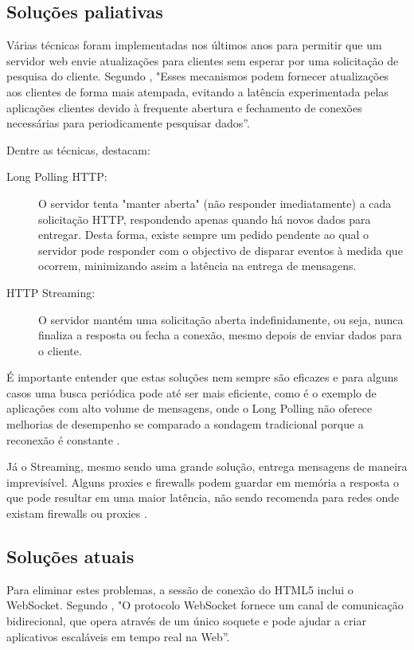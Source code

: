 \subsection{Soluções paliativas}

Várias técnicas foram implementadas nos últimos anos para permitir que um servidor web envie atualizações para clientes sem esperar por uma solicitação de pesquisa do cliente. Segundo \citet[p.~3]{Loreto2011}, "Esses mecanismos podem fornecer atualizações aos clientes de forma mais atempada, evitando a latência experimentada pelas aplicações clientes devido à frequente abertura e fechamento de conexões necessárias para periodicamente pesquisar dados”.

Dentre as técnicas, \citet{Loreto2011} destacam:
\begin{description}
	\item[Long Polling HTTP:] O servidor tenta "manter aberta" (não responder imediatamente) a cada solicitação HTTP, respondendo apenas quando há novos dados para entregar. Desta forma, existe sempre um pedido pendente ao qual o servidor pode responder com o objectivo de disparar eventos à medida que ocorrem, minimizando assim a latência na entrega de mensagens.

	\item[HTTP Streaming:] O servidor mantém uma solicitação aberta indefinidamente, ou seja, nunca finaliza a resposta ou fecha a conexão, mesmo depois de enviar dados para o cliente.
\end{description}

É importante entender que estas soluções nem sempre são eficazes e para alguns casos uma busca periódica pode até ser mais eficiente, como é o exemplo de aplicações com alto volume de mensagens, onde o Long Polling não oferece melhorias de desempenho se comparado a sondagem tradicional porque a reconexão é constante \citep{Wang2013}.

Já o Streaming, mesmo sendo uma grande solução, entrega mensagens de maneira imprevisível. Alguns proxies e firewalls podem guardar em memória a resposta o que pode resultar em uma maior latência, não sendo recomenda para redes onde existam firewalls ou proxies \citep[p.~6]{Wang2013}.

\subsection{Soluções atuais}

Para eliminar estes problemas, a sessão de conexão do HTML5 inclui o WebSocket. Segundo \citet[p.~47, Tradução~nossa]{Pimentel2012}, "O protocolo WebSocket fornece um canal de comunicação bidirecional, que opera através de um único soquete e pode ajudar a criar aplicativos escaláveis em tempo real na Web”.

